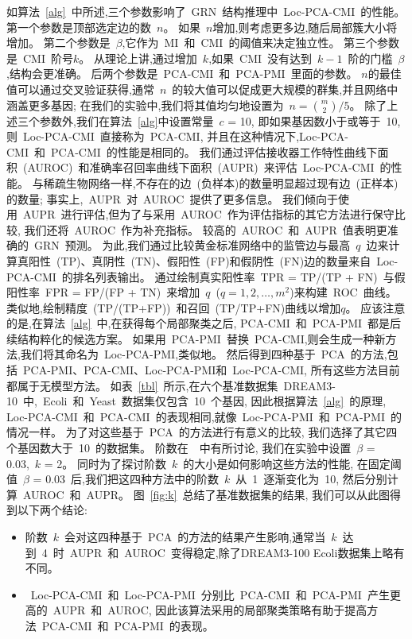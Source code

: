 如算法~\ref{alg}~中所述,三个参数影响了~GRN~结构推理中~Loc-PCA-CMI~的性能。
第一个参数是顶部选定边的数~$n$。
如果~$n$增加,则考虑更多边,随后局部簇大小将增加。
第二个参数是~$\beta$,它作为~MI~和~CMI~的阈值来决定独立性。
第三个参数是~CMI~阶号$k$。
从理论上讲,通过增加~$k$,如果~CMI~没有达到~$k-1$~阶的门槛~$\beta$,结构会更准确。
后两个参数是~PCA-CMI~和~PCA-PMI~里面的参数。
$n$的最佳值可以通过交叉验证获得,通常~$n$~的较大值可以促成更大规模的群集,并且网络中涵盖更多基因;
在我们的实验中,我们将其值均匀地设置为~$n =\binom{m} {2}/5$。
除了上述三个参数外,我们在算法~\ref{alg}中设置常量~$c$ = 10,
即如果基因数小于或等于~10,则~Loc-PCA-CMI~直接称为~PCA-CMI,
并且在这种情况下,Loc-PCA-CMI~和~PCA-CMI~的性能是相同的。
我们通过评估接收器工作特性曲线下面积~(AUROC)~和准确率召回率曲线下面积~(AUPR)~来评估~Loc-PCA-CMI~的性能。
与稀疏生物网络一样,不存在的边~(负样本)的数量明显超过现有边~(正样本)的数量; 
事实上,~AUPR~对~AUROC~\cite{saito2015precision}提供了更多信息。
我们倾向于使用~AUPR~进行评估,但为了与采用~AUROC~作为评估指标的其它方法进行保守比较,
我们还将~AUROC~作为补充指标。
较高的~AUROC~和~AUPR~值表明更准确的~GRN~预测。
为此,我们通过比较黄金标准网络中的监管边与最高~$q$~边来计算真阳性~(TP)、真阴性~(TN)、假阳性~(FP)和假阴性~(FN)边的数量来自~Loc-PCA-CMI~的排名列表输出。
通过绘制真实阳性率~TPR = TP/(TP + FN)~与假阳性率~FPR = FP/(FP + TN)~来增加~$q$~($q = 1, 2, \ldots, m^2$)来构建~ROC~曲线。
类似地,绘制精度~(TP/(TP+FP))~和召回~(TP/TP+FN)曲线以增加$q$。
应该注意的是,在算法~\ref{alg}~中,在获得每个局部聚类之后, PCA-CMI~和~PCA-PMI~都是后续结构粹化的候选方案。
如果用~PCA-PMI~替换~PCA-CMI,则会生成一种新方法,我们将其命名为~Loc-PCA-PMI,类似地。
然后得到四种基于~PCA~的方法,包括~PCA-PMI、PCA-CMI、Loc-PCA-PMI和~Loc-PCA-CMI,
所有这些方法目前都属于无模型方法。
如表~\ref{tbl}~所示,在六个基准数据集~DREAM3-10~中,~Ecoli~和~Yeast~数据集仅包含~10~个基因,
因此根据算法~\ref{alg}~的原理,
Loc-PCA-CMI~和~PCA-CMI~的表现相同,就像~Loc-PCA-PMI~和~PCA-PMI~的情况一样。
为了对这些基于~PCA~的方法进行有意义的比较,
我们选择了其它四个基因数大于~10~的数据集。
阶数在~\cite{zhang2011inferring,zhao2016part}~中有所讨论,
我们在实验中设置~$\beta$ = 0.03,~$k$ = 2。
同时为了探讨阶数~$k$~的大小是如何影响这些方法的性能,
在固定阈值~$\beta$ = 0.03~后,我们把这四种方法中的阶数~$k$~从~1~逐渐变化为~10,
然后分别计算~AUROC~和~AUPR。
图~\ref{fig:k}~总结了基准数据集的结果, 我们可以从此图得到以下两个结论:
\begin{itemize}
    \item 阶数~$k$~会对这四种基于~PCA~的方法的结果产生影响,通常当~$k$~达到~4~时~AUPR~和~AUROC~变得稳定,除了DREAM3-100 Ecoli数据集上略有不同。
    \item ~Loc-PCA-CMI~和~Loc-PCA-PMI~分别比~PCA-CMI~和~PCA-PMI~产生更高的~AUPR~和~AUROC,
    因此该算法采用的局部聚类策略有助于提高方法~PCA-CMI~和~PCA-PMI~的表现。
\end{itemize}

